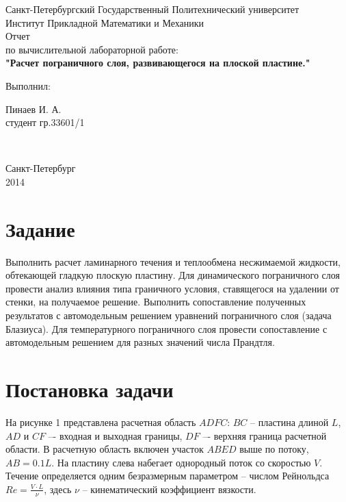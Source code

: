 \documentclass{article}
\newcommand{\pic}[3]
{
\noindent
\begin{minipage}{\linewidth}
  \center{\texttt{[image: \#2]}}
  \captionof{figure}{#3}
\end{minipage}
}
\begin{document}
\begin{center}{
\normalsize Санкт-Петербургский Государственный Политехнический университет\\
Институт Прикладной Математики и Механики\\
[7cm]
} 
\Huge Отчет\\ 
\large по вычислительной лабораторной работе:\\
\large	
\textbf{"Расчет пограничного слоя, развивающегося на плоской пластине."} \\
[5cm]
\begin{flushleft}
\quad\quad Выполнил:  \hspace{10 cm} \parbox[t]{4.5cm}{Пинаев И. А. \\ студент гр.33601/1 }\\
\end{flushleft}
\vfill
{\large Санкт-Петербург \\ 2014} 
\end{center}
\thispagestyle{empty}


\section{Задание}
Выполнить  расчет  ламинарного  течения  и  теплообмена  несжимаемой  жидкости,  обтекающей гладкую плоскую пластину. Для динамического пограничного слоя провести анализ влияния типа граничного условия, ставящегося на удалении от стенки, на получаемое решение. Выполнить сопоставление полученных результатов с автомодельным решением уравнений пограничного слоя (задача Блазиуса). Для температурного пограничного слоя провести сопоставление с автомодельным решением для разных значений числа Прандтля. 

\section{Постановка задачи}

\pic{1}{problem.png}{Рассчетная область.}

На рисунке 1 представлена расчетная область $ADFC$: $BC$ -- пластина длиной $L$, $AD$ и $CF$ –- входная и выходная границы, $DF$ –- верхняя граница расчетной области. В расчетную область включен участок $ABED$ выше по потоку, $AB = 0.1L$. На пластину слева набегает однородный поток со скоростью $V$. Течение определяется  одним  безразмерным  параметром – числом  Рейнольдса  $Re = \frac{V \cdot L}{\nu}$,  здесь  $\nu$ -- кинематический коэффициент вязкости. 
\end{document}
